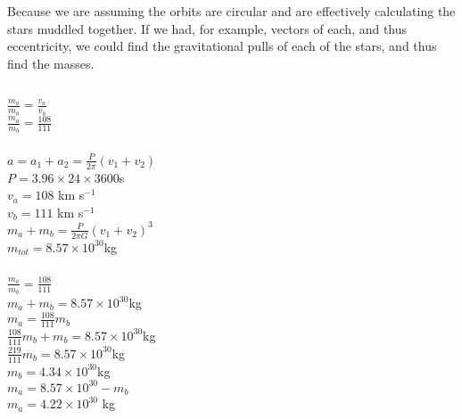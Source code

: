 \documentclass{article}
\begin{document}
\subsubsection{}
    \begin{center}
        Because we are assuming the orbits are circular and are effectively calculating the stars muddled together. If we had, for example, vectors of each, and thus eccentricity, we could find the gravitational pulls of each of the stars, and thus find the masses.
    \end{center}

\subsection{}
\subsubsection{}

\begin{center}
        \(\frac{m_a}{m_b} = \frac{v_a}{v_b}\)\\
        \(\frac{m_a}{m_b} = \frac{108}{111}\)
\end{center}

\subsubsection{}

\begin{center}
    \(a = a_1 + a_2 = \frac{P}{2\pi}(v_1 + v_2)\)\\
    \(P = 3.96 \times 24 \times 3600\)s \\
    \(v_a = 108 \) km s\(^{-1}\)\\
    \(v_b = 111 \) km s\(^{-1}\)\\
    \vspace{6mm}
    \(m_a + m_b = \frac{P}{2\pi G} (v_1 + v_2)^3 \)\\
    \(m_{tot} = 8.57 \times 10^{30}\)kg
\end{center}


\subsubsection{}
\begin{center}
    \(\frac{m_a}{m_b} = \frac{108}{111}\)\\
    \(m_a + m_b = 8.57 \times 10^{30}\)kg \\
    \(m_a = \frac{108}{111}m_b \)\\
    \(\frac{108}{111}m_b +m_b = 8.57 \times 10^{30}\)kg \\
    \(\frac{219}{111}m_b = 8.57 \times 10^{30}\)kg \\
    \(m_b = 4.34 \times 10^{30}\)kg\\
    \(m_a = 8.57 \times 10^{30} - m_b\)\\
    \(m_a = 4.22 \times 10^{30}\) kg




\end{center}
\end{document}
